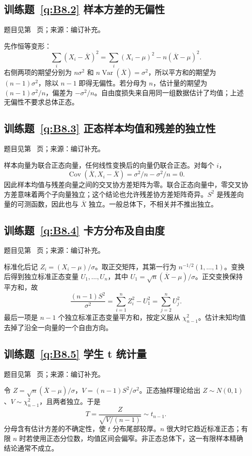 \documentclass[UTF8,12pt,a4paper,fontset=fandol]{ctexbook}
\begin{document}
\subsection*{训练题~\ref{q:B8.2} 样本方差的无偏性}\label{a:B8.2}{\small 题目见第~\pageref{q:B8.2} 页；来源：编订补充。}
\begin{solve}先作恒等变形：\[\sum_i(X_i-\overline X)^2=\sum_i(X_i-\mu)^2-n(\overline X-\mu)^2.\]右侧两项的期望分别为 $n\sigma^2$ 和 $n\operatorname{Var}(\overline X)=\sigma^2$，所以平方和的期望为 $(n-1)\sigma^2$，除以 $n-1$ 即得无偏性。若分母为 $n$，估计量的期望为 $(n-1)\sigma^2/n$，偏差为 $-\sigma^2/n$。自由度损失来自用同一组数据估计了均值；上述无偏性不要求总体正态。\end{solve}

\subsection*{训练题~\ref{q:B8.3} 正态样本均值和残差的独立性}\label{a:B8.3}{\small 题目见第~\pageref{q:B8.3} 页；来源：编订补充。}
\begin{solve}样本向量为联合正态向量，任何线性变换后的向量仍联合正态。对每个 $i$，\[\operatorname{Cov}(\overline X,X_i-\overline X)=\sigma^2/n-\sigma^2/n=0.\]因此样本均值与残差向量之间的交叉协方差矩阵为零。联合正态向量中，零交叉协方差意味着两个子向量独立；这个结论也允许残差协方差矩阵奇异。$S^2$ 是残差向量的可测函数，因此也与 $\overline X$ 独立。一般总体下，不相关并不推出独立。\end{solve}

\subsection*{训练题~\ref{q:B8.4} 卡方分布及自由度}\label{a:B8.4}{\small 题目见第~\pageref{q:B8.4} 页；来源：编订补充。}
\begin{solve}标准化后记 $Z_i=(X_i-\mu)/\sigma$。取正交矩阵，其第一行为 $n^{-1/2}(1,\ldots,1)$。变换后得到独立标准正态变量 $U_1,\ldots,U_n$，其中 $U_1=\sqrt n(\overline X-\mu)/\sigma$。正交变换保持平方和，故\[\frac{(n-1)S^2}{\sigma^2}=\sum_{i=1}^nZ_i^2-U_1^2=\sum_{j=2}^nU_j^2.\]最后一项是 $n-1$ 个独立标准正态变量平方和，按定义服从 $\chi^2_{n-1}$。估计未知均值去掉了沿全一向量的一个自由方向。\end{solve}

\subsection*{训练题~\ref{q:B8.5} 学生 t 统计量}\label{a:B8.5}{\small 题目见第~\pageref{q:B8.5} 页；来源：编订补充。}
\begin{solve}令 $Z=\sqrt n(\overline X-\mu)/\sigma$，$V=(n-1)S^2/\sigma^2$。正态抽样理论给出 $Z\sim N(0,1)$、$V\sim\chi^2_{n-1}$，且两者独立。于是\[T=\frac{Z}{\sqrt{V/(n-1)}}\sim t_{n-1}.\]分母含有估计方差的不确定性，使 $t$ 分布尾部较厚。$n$ 很大时它趋近标准正态；有限 $n$ 时若使用正态分位数，均值区间会偏窄。非正态总体下，这一有限样本精确结论通常不成立。\end{solve}
\end{document}
